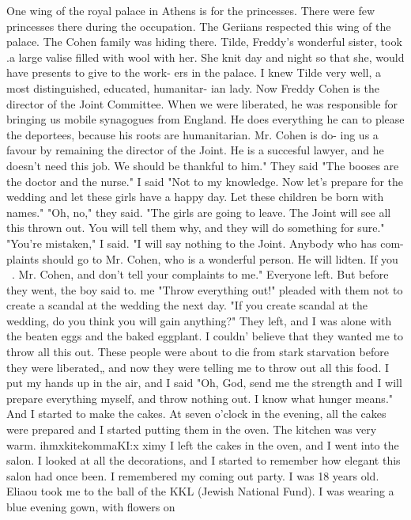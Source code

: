 One wing of the 
royal palace in Athens is for the princesses.
There were few princesses there during 
the occupation.
The Geriians respected this wing of the palace.
The Cohen family was 
hiding there.
Tilde, Freddy's wonderful sister, took .a large valise filled with wool 
with her.
She knit day and night so that she, would have presents to give to the work-
ers in the palace.
I knew Tilde very well, a most distinguished, educated, humanitar-
ian lady.
Now Freddy Cohen is the director of the Joint Committee.
When we were liberated, 
he was responsible for bringing us mobile synagogues from England.
He does everything 
he can to please the deportees, because his roots are humanitarian.
Mr.
Cohen is do-
ing us a favour by remaining the director of the Joint.
He is a succesful lawyer, and 
he doesn't need this job.
We should be thankful to him."
They said "The booses are the doctor and the nurse."
I said "Not to my knowledge.
Now let's prepare for the wedding and let these girls 
have a happy day.
Let these children be born with names."
"Oh, no," they said.
"The girls are going to leave.
The Joint will see all this 
thrown out.
You will tell them why, and they will do something for sure."
"You're mistaken," I said.
"I will say nothing to the Joint.
Anybody who has com-
plaints should go to Mr.
Cohen, who is a wonderful person.
He will lidten.
If you 
~.
Mr.
Cohen, and don't tell your complaints to me."
Everyone left.
But before they went, the boy said to.
me "Throw everything out!"
pleaded with them not to create a scandal at the wedding the next day.
"If you create 
scandal at the wedding, do you think you will gain anything?"
They left, and I was alone with the beaten eggs and the baked eggplant.
I couldn' 
believe that they wanted me to throw all this out.
These people were about to die from 
stark starvation before they were liberated„ and now they were telling me to throw out 
all this food.
I put my hands up in the air, and I said "Oh, God, send me the strength and I will 
prepare everything myself, and throw nothing out.
I know what hunger means."
And I 
started to make the cakes.
At seven o'clock in the evening, all the cakes were prepared 
and I started putting them in the oven.
The kitchen was very warm.
ihmxkitekommaKI:x 
ximy I left the cakes in the oven, and I went into the salon.
I looked at all the 
decorations, and I started to remember how elegant this salon had once been.
I remembered my coming out party.
I was 18 years old.
Eliaou took me to the ball 
of the KKL (Jewish National Fund).
I was wearing a blue evening gown, with flowers on 
